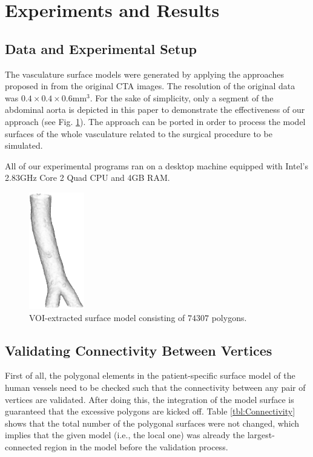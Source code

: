 
\section{Experiments and Results}
\label{sec6_3}

\subsection{Data and Experimental Setup}

The vasculature surface models were generated by applying the approaches proposed in \cite{Yang2014ICRA} from the original CTA images.
The resolution of the original data was $0.4 \times 0.4 \times 0.6 \text{mm}^3$.
For the sake of simplicity, only a segment of the abdominal aorta is depicted in this paper to demonstrate the effectiveness of our approach (see Fig. \ref{fig:VOI}).
The approach can be ported in order to process the model surfaces of the whole vasculature related to the surgical procedure to be simulated.

All of our experimental programs ran on a desktop machine equipped with Intel's 2.83GHz Core 2 Quad CPU and 4GB RAM.

\begin{figure}[t]
\centering
\includegraphics[height=2.0in]{figures/chap06/original.eps}
\caption{VOI-extracted surface model consisting of $74307$ polygons.}
\label{fig:VOI}
\end{figure}

\subsection{Validating Connectivity Between Vertices}

First of all, the polygonal elements in the patient-specific surface model of the human vessels need to be checked such that the connectivity between any pair of vertices are validated. %
After doing this, the integration of the model surface is guaranteed that the excessive polygons are kicked off.
Table \ref{tbl:Connectivity} shows that the total number of the polygonal surfaces were not changed, which implies that the given model (i.e., the local one) was already the largest-connected region in the model before the validation process. %


